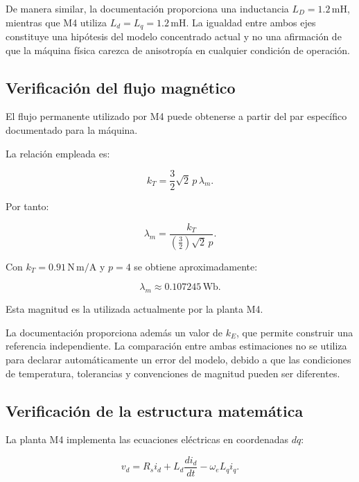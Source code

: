 De manera similar, la documentación proporciona una inductancia $L_D=1.2\,\mathrm{mH}$, mientras que M4 utiliza $L_d=L_q=1.2\,\mathrm{mH}$. La igualdad entre ambos ejes constituye una hipótesis del modelo concentrado actual y no una afirmación de que la máquina física carezca de anisotropía en cualquier condición de operación.

\subsection{Verificación del flujo magnético}

El flujo permanente utilizado por M4 puede obtenerse a partir del par específico documentado para la máquina.

La relación empleada es:

\begin{equation}
k_T=
\frac{3}{2}\sqrt{2}\,p\,\lambda_m.
\end{equation}

Por tanto:

\begin{equation}
\lambda_m=
\frac{k_T}
{\left(\frac{3}{2}\right)\sqrt{2}\,p}.
\end{equation}

Con $k_T=0.91\,\mathrm{N\,m/A}$ y $p=4$ se obtiene aproximadamente:

\begin{equation}
\lambda_m\approx0.107245\,\mathrm{Wb}.
\end{equation}

Esta magnitud es la utilizada actualmente por la planta M4.

La documentación proporciona además un valor de $k_E$, que permite construir una referencia independiente. La comparación entre ambas estimaciones no se utiliza para declarar automáticamente un error del modelo, debido a que las condiciones de temperatura, tolerancias y convenciones de magnitud pueden ser diferentes.

\subsection{Verificación de la estructura matemática}

La planta M4 implementa las ecuaciones eléctricas en coordenadas $dq$:

\begin{equation}
v_d=
R_si_d+
L_d\frac{di_d}{dt}
-
\omega_eL_qi_q.
\end{equation}

